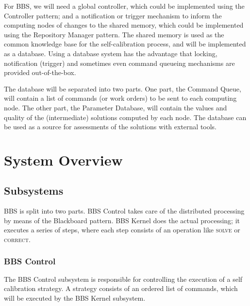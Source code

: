 \documentclass[10pt]{lofar}
\newcommand{\correct}{\textsc{correct}\xspace}
\newcommand{\solve}{\textsc{solve}\xspace}
\begin{document}
For BBS, we will need a global controller, which could be implemented using
the Controller pattern; and a notification or trigger mechanism to inform the
computing nodes of changes to the shared memory, which could be implemented
using the Repository Manager pattern. The shared memory is used as the common
knowledge base for the self-calibration process, and will be implemented as a
database. Using a database system has the advantage that locking, notification
(trigger) and sometimes even command queueing mechanisms are provided
out-of-the-box.

The database will be separated into two parts. One part, the Command Queue, will
contain a list of commands (or work orders) to be sent to each computing node.
The other part, the Parameter Database, will contain the values and quality of
the (intermediate) solutions computed by each node. The database can be used as
a source for assessments of the solutions with external tools.

\cleardoublepage

\section{System Overview}
\label{sec:overview}

\subsection{Subsystems}
\label{subsec:subsystems}
BBS is split into two parts. BBS Control takes care of the distributed
processing by means of the Blackboard pattern. BBS Kernel does the actual
processing; it executes a series of steps, where each step consists of an
operation like \solve or \correct.


\subsubsection{BBS Control}
\label{subsubsec:sys-control}

The BBS Control subsystem is responsible for controlling the execution of a
self calibration strategy. A strategy consists of an ordered list of commands,
which will be executed by the BBS Kernel subsystem.
\end{document}

